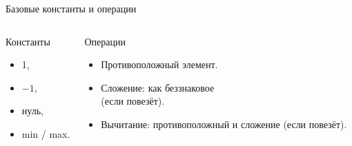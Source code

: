 \begin{frame}{Базовые константы и операции}

\begin{columns}
    \column{3cm}
\begin{block}{Константы}
\pause
\begin{itemize}
    \item 1,
    \item $-1$,
    \item нуль,
    \item min / max.
\end{itemize}
\end{block}

\pause
    \column{7cm}
\begin{block}{Операции}
\begin{itemize}
    \item {\color{red}Противоположный элемент.}
    \item Сложение: как беззнаковое\\ \hfill(если повезёт).
    \item Вычитание: противоположный и сложение (если повезёт).
\end{itemize}
\end{block}
\end{columns}

\end{frame}

